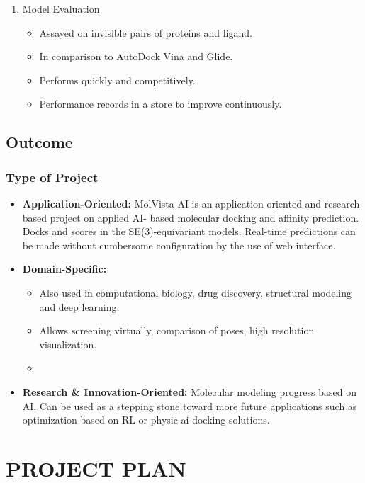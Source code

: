 \documentclass[12pt,a4]{report}
\begin{document}
\begin{enumerate}
    \item Model Evaluation
    \begin{itemize}
        \item Assayed on invisible pairs of proteins and ligand.
        \item In comparison to AutoDock Vina and Glide.
        \item Performs quickly and competitively.
        \item Performance records in a store to improve continuously.
    \end{itemize}
\end{enumerate}



\section{Outcome}
\subsection{Type of Project}
\hspace*{0.3in}
\begin{itemize}
    \item \textbf{Application-Oriented:}  
    MolVista AI is an application-oriented and research based project on applied AI- based molecular docking and affinity prediction. Docks and scores in the SE(3)-equivariant models. Real-time predictions can be made without cumbersome configuration by the use of web interface.

    \item \textbf{Domain-Specific:}
    \begin{itemize}
        \item Also used in computational biology, drug discovery, structural modeling and deep learning.
        \item Allows screening virtually, comparison of poses, high resolution visualization.
        \item 
    \end{itemize}

    \item \textbf{Research \& Innovation-Oriented:}  
    Molecular modeling progress based on AI. Can be used as a stepping stone toward more future applications such as optimization based on RL or physic-ai docking solutions.
\end{itemize}

\chapter{PROJECT PLAN}
\end{document}

